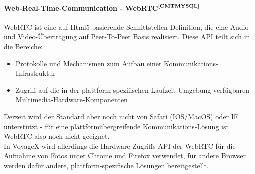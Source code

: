 \paragraph{Web-Real-Time-Communication - WebRTC$^{\textbf{\ref{CMTMYSQL}}}$}
\addtocounter{footnote}{1}%
WebRTC ist eine auf Html5 basierende Schnittstellen-Definition, die eine Audio- und Video-Übertragung auf Peer-To-Peer Basis realisiert. Diese API teilt sich in die Bereiche:
\begin{itemize}[leftmargin=*,noitemsep,topsep=1ex,parsep=0pt,partopsep=0pt]
\item Protokolle und Mechanismen zum Aufbau einer Kommunikations-Infrastruktur
\item Zugriff auf die in der plattform-spezifischen Laufzeit-Umgebung verfügbaren Multimedia-Hardware-Komponenten
\end{itemize}
Derzeit wird der Standard aber noch nicht von Safari (IOS/MacOS) oder IE unterstützt - für eine plattformübergreifende Kommunikations-Lösung ist WebRTC also noch nicht geeignet.\\
In VoyageX wird allerdings die Hardware-Zugriffs-API der WebRTC für die Aufnahme von Fotos unter Chrome und Firefox verwendet, für andere Browser werden dafür andere, plattform-spezifische Lösungen bereitgestellt.

